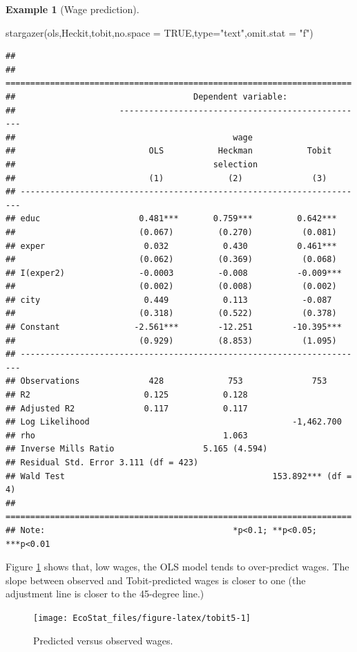 \documentclass[
  12pt,
]{book}
\newenvironment{Shaded}{\begin{snugshade}}{\end{snugshade}}
\newcommand{\AttributeTok}[1]{\textcolor[rgb]{0.77,0.63,0.00}{#1}}
\newcommand{\ConstantTok}[1]{\textcolor[rgb]{0.00,0.00,0.00}{#1}}
\newcommand{\FunctionTok}[1]{\textcolor[rgb]{0.00,0.00,0.00}{#1}}
\newcommand{\NormalTok}[1]{#1}
\newcommand{\StringTok}[1]{\textcolor[rgb]{0.31,0.60,0.02}{#1}}
\theoremstyle{definition}
\theoremstyle{definition}
\newtheorem{example}{Example}[chapter]
\theoremstyle{definition}
\theoremstyle{definition}
\theoremstyle{remark}
\begin{document}
\begin{example}[Wage prediction]
\begin{Shaded}
\begin{Highlighting}[]
\FunctionTok{stargazer}\NormalTok{(ols,Heckit,tobit,}\AttributeTok{no.space =} \ConstantTok{TRUE}\NormalTok{,}\AttributeTok{type=}\StringTok{"text"}\NormalTok{,}\AttributeTok{omit.stat =} \StringTok{"f"}\NormalTok{)}
\end{Highlighting}
\end{Shaded}

\begin{verbatim}
## 
## ======================================================================
##                                    Dependent variable:                
##                     --------------------------------------------------
##                                            wage                       
##                           OLS           Heckman           Tobit       
##                                        selection                      
##                           (1)             (2)              (3)        
## ----------------------------------------------------------------------
## educ                    0.481***       0.759***         0.642***      
##                         (0.067)         (0.270)          (0.081)      
## exper                    0.032           0.430          0.461***      
##                         (0.062)         (0.369)          (0.068)      
## I(exper2)               -0.0003         -0.008          -0.009***     
##                         (0.002)         (0.008)          (0.002)      
## city                     0.449           0.113           -0.087       
##                         (0.318)         (0.522)          (0.378)      
## Constant               -2.561***        -12.251        -10.395***     
##                         (0.929)         (8.853)          (1.095)      
## ----------------------------------------------------------------------
## Observations              428             753              753        
## R2                       0.125           0.128                        
## Adjusted R2              0.117           0.117                        
## Log Likelihood                                         -1,462.700     
## rho                                      1.063                        
## Inverse Mills Ratio                  5.165 (4.594)                    
## Residual Std. Error 3.111 (df = 423)                                  
## Wald Test                                          153.892*** (df = 4)
## ======================================================================
## Note:                                      *p<0.1; **p<0.05; ***p<0.01
\end{verbatim}

Figure \ref{fig:tobit5} shows that, low wages, the OLS model tends to over-predict wages. The slope between observed and Tobit-predicted wages is closer to one (the adjustment line is closer to the 45-degree line.)

\begin{figure}
\texttt{[image: EcoStat\_files/figure-latex/tobit5-1]} \caption{Predicted versus observed wages.}\label{fig:tobit5}
\end{figure}

\end{example}
\end{document}
